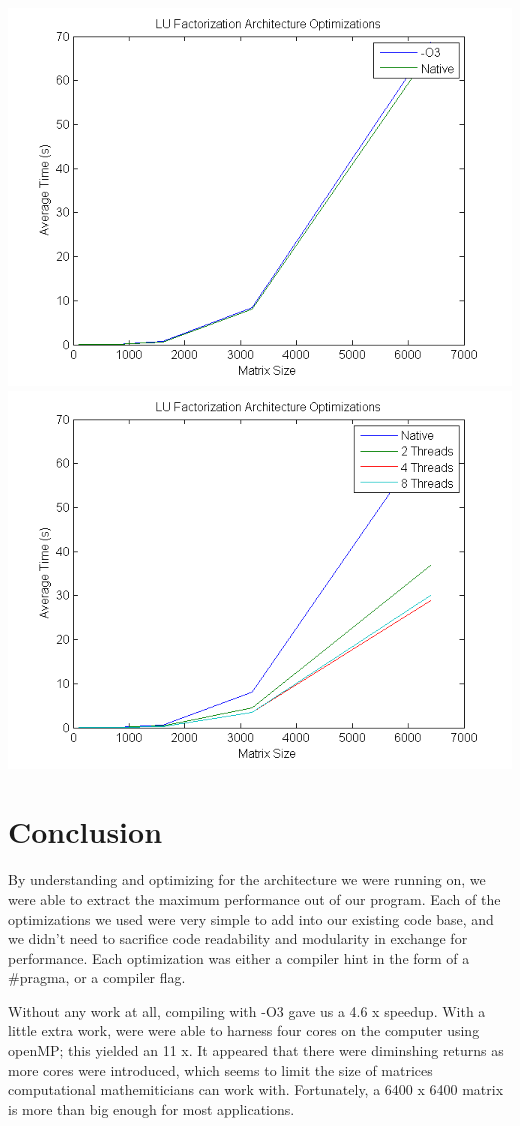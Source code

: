 \documentclass[12]{article}
\begin{document}
\includegraphics[scale=0.5]{figures/fig4}
\includegraphics[scale=0.5]{figures/fig5}

\section{Conclusion}

By understanding and optimizing for the architecture we were running on, we were able to extract the maximum performance out of our program.  Each of the optimizations we used were very simple to add into our existing code base, and we didn't need to sacrifice code readability and modularity in exchange for performance.  Each optimization was either a compiler hint in the form of a \#pragma, or a compiler flag. 

Without any work at all, compiling with -O3 gave us a 4.6 x speedup.  With a little extra work, were were able to harness four cores on the computer using openMP; this yielded an 11 x.  It appeared that there were diminshing returns as more cores were introduced, which seems to limit the size of matrices computational mathemiticians can work with.  Fortunately, a 6400 x 6400 matrix is more than big enough for most applications.   
\end{document}
